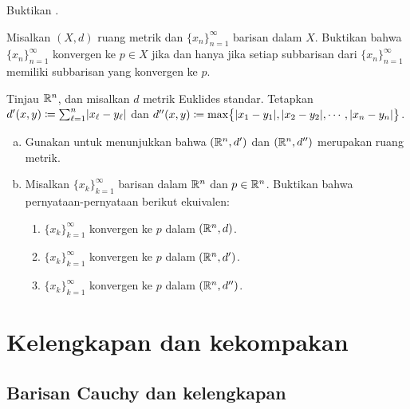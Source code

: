 \begin{exercise}
Buktikan .
\end{exercise}

\begin{exercise}
Misalkan $(X,d)$ ruang metrik dan $\{ x_n \}_{n=1}^\infty$ barisan dalam $X$.
Buktikan bahwa $\{ x_n \}_{n=1}^\infty$ konvergen ke $p \in X$
jika dan hanya jika
setiap subbarisan dari $\{ x_n \}_{n=1}^\infty$ memiliki subbarisan yang
konvergen ke $p$.
\end{exercise}

\begin{exercise}
Tinjau ${\mathbb{R}}^n$, dan misalkan $d$ metrik Euklides standar.
Tetapkan $d'(x,y) \coloneqq \sum_{\ell=1}^n \lvert {x_\ell-y_\ell} \rvert$ dan
$d''(x,y) \coloneqq \max \bigl\{
\lvert {x_1-y_1} \rvert,\lvert {x_2-y_2} \rvert,\cdots,\lvert {x_n-y_n} \rvert
\bigr\}$.
\begin{enumerate}[a)]
\item
Gunakan  untuk menunjukkan bahwa
$({\mathbb{R}}^n,d')$ dan
$({\mathbb{R}}^n,d'')$ merupakan ruang metrik.
\item
Misalkan $\{ x_k \}_{k=1}^\infty$ barisan dalam ${\mathbb{R}}^n$ dan $p \in {\mathbb{R}}^n$.
Buktikan bahwa pernyataan-pernyataan berikut ekuivalen:
\begin{enumerate}[(1)]
\item
$\{ x_k \}_{k=1}^\infty$ konvergen ke $p$ dalam $({\mathbb{R}}^n,d)$.
\item
$\{ x_k \}_{k=1}^\infty$ konvergen ke $p$ dalam $({\mathbb{R}}^n,d')$.
\item
$\{ x_k \}_{k=1}^\infty$ konvergen ke $p$ dalam $({\mathbb{R}}^n,d'')$.
\end{enumerate}
\end{enumerate}
\end{exercise}


\sectionnewpage
\section{Kelengkapan dan kekompakan}
\label{sec:metcompact}



\subsection{Barisan Cauchy dan kelengkapan}

